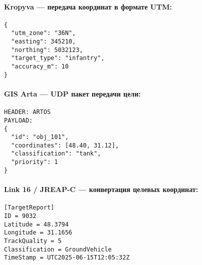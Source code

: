 \documentclass{article}
\begin{document}
\paragraph{Kropyva — передача координат в формате UTM:}
\begin{verbatim}
{
  "utm_zone": "36N",
  "easting": 345210,
  "northing": 5032123,
  "target_type": "infantry",
  "accuracy_m": 10
}
\end{verbatim}

\paragraph{GIS Arta — UDP пакет передачи цели:}
\begin{verbatim}
HEADER: ARTOS
PAYLOAD:
{
  "id": "obj_101",
  "coordinates": [48.40, 31.12],
  "classification": "tank",
  "priority": 1
}
\end{verbatim}

\paragraph{Link 16 / JREAP-C — конвертация целевых координат:}
\begin{verbatim}
[TargetReport]
ID = 9032
Latitude = 48.3794
Longitude = 31.1656
TrackQuality = 5
Classification = GroundVehicle
TimeStamp = UTC2025-06-15T12:05:32Z
\end{verbatim}

\end{document}
